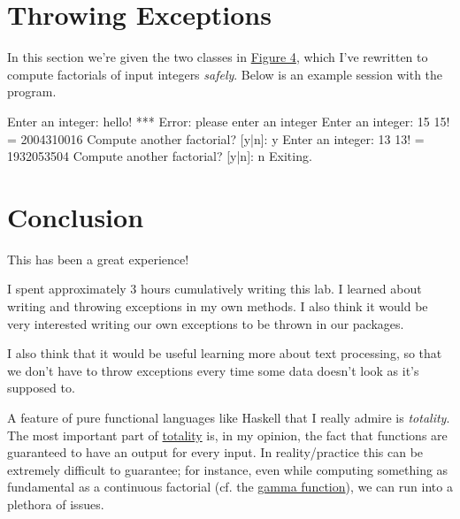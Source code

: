 \documentclass[leqno, 11pt]{article}
\newcommand{\iftcodefigure}[3]{%
  \begin{codefigure}
    \label{#1}
    \addtocounter{figure}{-1}
    
  \end{codefigure}
}
\begin{document}
\section{Throwing Exceptions}
In this section we're given the two classes in \hyperref[fig:four]{Figure 4}, which I've rewritten to compute factorials of input integers \textit{safely}. Below is an example session with the program.
\begin{verbbox}[\mbox{}\scriptsize]
Enter an integer: hello!
*** Error: please enter an integer
Enter an integer: 15
15! = 2004310016
Compute another factorial? [y|n]: y
Enter an integer: 13
13! = 1932053504
Compute another factorial? [y|n]: n
Exiting.
\end{verbbox}
\begin{center}
  \theverbbox
\end{center}
\section{Conclusion}
This has been a great experience!

I spent approximately 3 hours cumulatively writing this lab. I learned about writing and throwing exceptions in my own methods. I also think it would be very interested writing our own exceptions to be thrown in our packages. 

I also think that it would be useful learning more about text processing, so that we don't have to throw exceptions every time some data doesn't look as it's supposed to.

A feature of pure functional languages like Haskell that I really admire is \textit{totality}. The most important part of \href{https://en.wikipedia.org/wiki/Total_functional_programming}{totality} is, in my opinion, the fact that functions are guaranteed to have an output for every input. In reality/practice this can be extremely difficult to guarantee; for instance, even while computing something as fundamental as a continuous factorial (cf. the \href{https://en.wikipedia.org/wiki/Gamma_function}{gamma function}), we can run into a plethora of issues.
\iftcodefigure{fig:four}{Factorials.java}{%
  /mnt/c/Users/bdoyle/eclipse-workspace/ift_labs/src/lab_6/Factorials.java}
\end{document}

